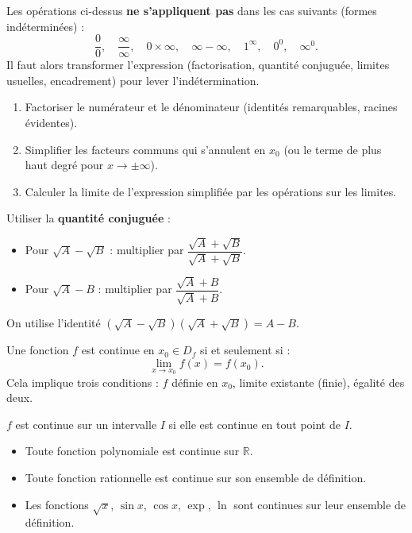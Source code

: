 \documentclass[11pt]{article}
\newcommand{\cle}[1]{{\popxbold\color{popdark}#1}}
\begin{document}
\begin{attention}
Les opérations ci-dessus \textbf{ne s'appliquent pas} dans les cas suivants (formes indéterminées) :
\[ \frac{0}{0},\quad \frac{\infty}{\infty},\quad 0\times\infty,\quad \infty-\infty,\quad 1^\infty,\quad 0^0,\quad \infty^0. \]
Il faut alors transformer l'expression (factorisation, quantité conjuguée, limites usuelles, encadrement) pour lever l'indétermination.
\end{attention}

\begin{methode}
\begin{enumerate}
\item Factoriser le numérateur et le dénominateur (identités remarquables, racines évidentes).
\item Simplifier les facteurs communs qui s'annulent en $x_0$ (ou le terme de plus haut degré pour $x\to\pm\infty$).
\item Calculer la limite de l'expression simplifiée par les opérations sur les limites.
\end{enumerate}
\end{methode}

\begin{methode}
Utiliser la \textbf{quantité conjuguée} :
\begin{itemize}
\item Pour $\sqrt{A}-\sqrt{B}$ : multiplier par $\dfrac{\sqrt{A}+\sqrt{B}}{\sqrt{A}+\sqrt{B}}$.
\item Pour $\sqrt{A}-B$ : multiplier par $\dfrac{\sqrt{A}+B}{\sqrt{A}+B}$.
\end{itemize}
On utilise l'identité $(\sqrt{A}-\sqrt{B})(\sqrt{A}+\sqrt{B})=A-B$.
\end{methode}

\begin{definition}
Une fonction $f$ est \cle{continue} en $x_0 \in D_f$ si et seulement si :
\[ \lim_{x\to x_0}f(x)=f(x_0). \]
Cela implique trois conditions : $f$ définie en $x_0$, limite existante (finie), égalité des deux.
\end{definition}

\begin{propriete}
$f$ est continue sur un intervalle $I$ si elle est continue en tout point de $I$.
\begin{itemize}
\item Toute fonction polynomiale est continue sur $\mathbb{R}$.
\item Toute fonction rationnelle est continue sur son ensemble de définition.
\item Les fonctions $\sqrt{x}$, $\sin x$, $\cos x$, $\exp$, $\ln$ sont continues sur leur ensemble de définition.
\end{itemize}
\end{propriete}
\end{document}
